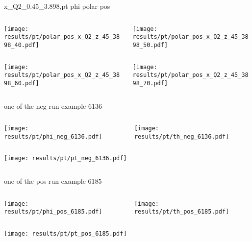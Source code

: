 \begin{frame}{x\_Q2\_0.45\_3.898,pt phi polar pos}
\begin{columns}
\begin{column}[T]{0.5\textwidth}
\texttt{[image: results/pt/polar\_pos\_x\_Q2\_z\_45\_3898\_40.pdf]}
\end{column}
\begin{column}[T]{0.5\textwidth}
\texttt{[image: results/pt/polar\_pos\_x\_Q2\_z\_45\_3898\_50.pdf]}
\end{column}
\end{columns}
\begin{columns}
\begin{column}[T]{0.5\textwidth}
\texttt{[image: results/pt/polar\_pos\_x\_Q2\_z\_45\_3898\_60.pdf]}
\end{column}
\begin{column}[T]{0.5\textwidth}
\texttt{[image: results/pt/polar\_pos\_x\_Q2\_z\_45\_3898\_70.pdf]}
\end{column}
\end{columns}
\end{frame}
\begin{frame}{one of the neg run example 6136}
\begin{columns}
\begin{column}[T]{0.5\textwidth}
\texttt{[image: results/pt/phi\_neg\_6136.pdf]}
\end{column}
\begin{column}[T]{0.5\textwidth}
\texttt{[image: results/pt/th\_neg\_6136.pdf]}
\end{column}
\end{columns}
\begin{columns}
\begin{column}[T]{0.5\textwidth}
\texttt{[image: results/pt/pt\_neg\_6136.pdf]}
\end{column}
\begin{column}[T]{0.5\textwidth}
\end{column}
\end{columns}
\end{frame}
\begin{frame}{one of the pos run example 6185}
\begin{columns}
\begin{column}[T]{0.5\textwidth}
\texttt{[image: results/pt/phi\_pos\_6185.pdf]}
\end{column}
\begin{column}[T]{0.5\textwidth}
\texttt{[image: results/pt/th\_pos\_6185.pdf]}
\end{column}
\end{columns}
\begin{columns}
\begin{column}[T]{0.5\textwidth}
\texttt{[image: results/pt/pt\_pos\_6185.pdf]}
\end{column}
\begin{column}[T]{0.5\textwidth}
\end{column}
\end{columns}
\end{frame}

